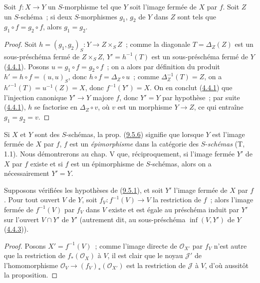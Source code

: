 \begin{corollary}[9.5.6]
\label{I.9.5.6-fr}
Soit $f:X\to Y$ un $S$-morphisme tel que $Y$ soit l'image fermée de $X$ par
$f$. Soit $Z$ un $S$-schéma~; si deux $S$-morphismes $g_1$, $g_2$ de $Y$
dans $Z$ sont tels que $g_1\circ f=g_2\circ f$, alors $g_1=g_2$.
\end{corollary}

\begin{proof}
Soit $h=(g_1,g_2)_S:Y\to Z\times_S Z$~; comme la diagonale
$T=\Delta_Z(Z)$ est un sous-préschéma fermé de $Z\times_S Z$,
$Y'=h^{-1}(T)$ est un sous-préschéma fermé de $Y$
(\hyperref[I.4.4.1-fr]{4.4.1}). Posons $u=g_1\circ f=g_2\circ f$~; on a
alors par définition du produit $h'=h\circ f=(u,u)_S$, donc
$h\circ f=\Delta_Z\circ u$~; comme $\Delta_Z^{-1}(T)=Z$, on a
$h'^{-1}(T)=u^{-1}(Z)=X$, donc $f^{-1}(Y')=X$. On en conclut
(\hyperref[I.4.4.1-fr]{4.4.1}) que l'injection canonique $Y'\to Y$ majore
$f$, donc $Y'=Y$ par hypothèse~; par suite
(\hyperref[I.4.4.1-fr]{4.4.1}), $h$ se factorise en $\Delta_Z\circ v$, où
$v$ est un morphisme $Y\to Z$, ce qui entraîne $g_1=g_2=v$.
\end{proof}

\begin{remark}[9.5.7]
\label{I.9.5.7-fr}
Si $X$ et $Y$ sont des $S$-schémas, la prop.
(\hyperref[I.9.5.6-fr]{9.5.6}) signifie que
lorsque $Y$ est l'image fermée de $X$ par $f$, $f$ est un
\emph{épimorphisme} dans la catégorie des $S$-\emph{schémas} (T, 1.1). Nous
démontrerons au chap. V que, réciproquement, si l'image fermée $Y'$ de $X$
par $f$ existe et si $f$ est un épimorphisme de $S$-schémas, alors on a
nécessairement $Y'=Y$.
\end{remark}

\begin{proposition}[9.5.8]
\label{I.9.5.8-fr}
Supposons vérifiées les hypothèses de (\hyperref[I.9.5.1-fr]{9.5.1}), et
soit $Y'$ l'image fermée de $X$ par $f$. Pour tout ouvert $V$ de $Y$, soit
$f_V:f^{-1}(V)\to V$ la restriction de $f$~; alors l'image fermée de
$f^{-1}(V)$ par $f_V$ dans $V$ existe et est égale au préschéma induit par
$Y'$ sur l'ouvert $V\cap Y'$ de $Y'$ \textup{(autrement dit, au sous-préschéma
$\inf(V,Y')$ de $Y$ (\hyperref[I.4.4.3-fr]{4.4.3}))}.
\end{proposition}

\begin{proof}
Posons $X'=f^{-1}(V)$~; comme l'image directe de $\mathscr{O}_{X'}$ par
$f_V$ n'est autre que la restriction de $f_*(\mathscr{O}_X)$ à $V$, il est
clair que le noyau $\mathscr{J}'$ de l'homomorphisme
$\mathscr{O}_V\to(f_V)_*(\mathscr{O}_{X'})$ est la restriction de
$\mathscr{J}$ à $V$, d'où aussitôt la proposition.
\end{proof}

